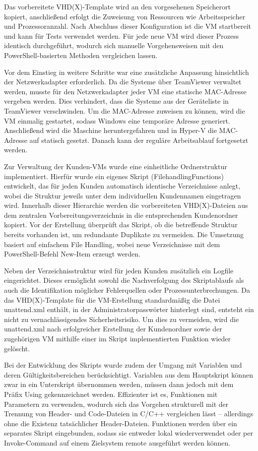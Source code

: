 \documentclass[conference]{IEEEtran}
\begin{document}
Das vorbereitete VHD(X)-Template wird an den vorgesehenen Speicherort kopiert, anschließend erfolgt die Zuweisung von Ressourcen wie Arbeitsspeicher und Prozessoranzahl. Nach Abschluss dieser Konfiguration ist die VM startbereit und kann für Tests verwendet werden. Für jede neue VM wird dieser Prozess identisch durchgeführt, wodurch sich manuelle Vorgehensweisen mit den PowerShell-basierten Methoden vergleichen lassen.

Vor dem Einstieg in weitere Schritte war eine zusätzliche Anpassung hinsichtlich der Netzwerkadapter erforderlich. Da die Systeme über TeamViewer verwaltet werden, musste für den Netzwerkadapter jeder VM eine statische MAC-Adresse vergeben werden. Dies verhindert, dass die Systeme aus der Geräteliste in TeamViewer verschwinden. Um die MAC-Adresse zuweisen zu können, wird die VM einmalig gestartet, sodass Windows eine temporäre Adresse generiert. Anschließend wird die Maschine heruntergefahren und in Hyper-V die MAC-Adresse auf statisch gesetzt. Danach kann der reguläre Arbeitsablauf fortgesetzt werden.

Zur Verwaltung der Kunden-VMs wurde eine einheitliche Ordnerstruktur implementiert. Hierfür wurde ein eigenes Skript (FilehandlingFunctions) entwickelt, das für jeden Kunden automatisch identische Verzeichnisse anlegt, wobei die Struktur jeweils unter dem individuellen Kundennamen eingetragen wird. Innerhalb dieser Hierarchie werden die vorbereiteten VHD(X)-Dateien aus dem zentralen Vorbereitungsverzeichnis in die entsprechenden Kundenordner kopiert. Vor der Erstellung überprüft das Skript, ob die betreffende Struktur bereits vorhanden ist, um redundante Duplikate zu vermeiden. Die Umsetzung basiert auf einfachem File Handling, wobei neue Verzeichnisse mit dem PowerShell-Befehl New-Item erzeugt werden.

Neben der Verzeichnisstruktur wird für jeden Kunden zusätzlich ein Logfile eingerichtet. Dieses ermöglicht sowohl die Nachverfolgung des Skriptablaufs als auch die Identifikation möglicher Fehlerquellen oder Prozessunterbrechungen. Da das VHD(X)-Template für die VM-Erstellung standardmäßig die Datei unattend.xml enthält, in der Administratorpasswörter hinterlegt sind, entsteht ein nicht zu vernachlässigendes Sicherheitsrisiko. Um dies zu vermeiden, wird die unattend.xml nach erfolgreicher Erstellung der Kundenordner sowie der zugehörigen VM mithilfe einer im Skript implementierten Funktion wieder gelöscht.

Bei der Entwicklung des Skripts wurde zudem der Umgang mit Variablen und deren Gültigkeitsbereichen berücksichtigt. Variablen aus dem Hauptskript können zwar in ein Unterskript übernommen werden, müssen dann jedoch mit dem Präfix Using gekennzeichnet werden. Effizienter ist es, Funktionen mit Parametern zu verwenden, wodurch sich das Vorgehen strukturell mit der Trennung von Header- und Code-Dateien in C/C++ vergleichen lässt – allerdings ohne die Existenz tatsächlicher Header-Dateien. Funktionen werden über ein separates Skript eingebunden, sodass sie entweder lokal wiederverwendet oder per Invoke-Command auf einem Zielsystem remote ausgeführt werden können.
\end{document}
